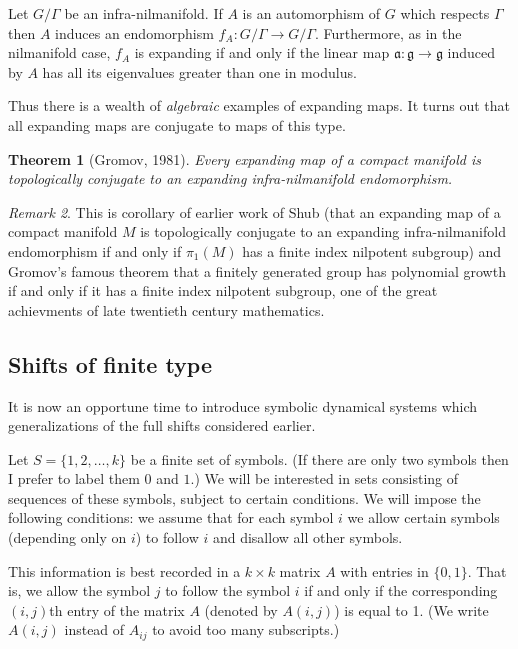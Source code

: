 \documentclass[12pt]{article}
\newtheorem{theorem}{Theorem}[section]
\theoremstyle{definition}
\theoremstyle{remark}
\newtheorem{remark}[theorem]{Remark}
\begin{document}
Let $G/\Gamma$ be an infra-nilmanifold. If $A$ is an automorphism of $G$ which respects $\Gamma$
then $A$ induces an endomorphism $f_A : G/\Gamma \to G/\Gamma$. Furthermore, as in the nilmanifold case, $f_A$ is expanding 
if and only if the linear map $\mathfrak a : \mathfrak g \to \mathfrak g$ induced by $A$ has all its eigenvalues 
greater than one in modulus. 

Thus there is a wealth of {\it algebraic} examples of expanding maps.
It turns out that all expanding maps are conjugate to maps of this type.



\begin{theorem}[Gromov, 1981] 
Every expanding map of a compact manifold is topologically conjugate to an expanding infra-nilmanifold endomorphism.
\end{theorem}

\begin{remark}
This is corollary of earlier work of Shub (that an expanding map of a compact manifold $M$ is topologically conjugate to an expanding infra-nilmanifold endomorphism if and only if $\pi_1(M)$ has a finite index nilpotent subgroup)
and Gromov's famous theorem that a finitely generated group has polynomial growth if and only
if it has a finite index nilpotent subgroup, one of the great achievments of late twentieth 
century mathematics.
\end{remark}

\subsection{Shifts of finite type}

It is now an opportune time to introduce symbolic dynamical systems which generalizations of the full shifts considered earlier.

Let $S = \{1,2,\ldots, k\}$ be a finite set of symbols.  (If there are only two symbols then I prefer to label them $0$ and $1$.)
We will be
interested in sets consisting of sequences of these symbols, subject
to certain conditions.  We will impose the following conditions: we
assume that for each symbol $i$ we allow certain symbols (depending
only on $i$) to follow $i$ and disallow all other symbols.

This information is best recorded in a $k \times k$ matrix $A$ with
entries in $\{0,1\}$.  That is, we allow the symbol $j$ to follow the
symbol $i$ if and only if the corresponding $(i,j)$th entry of the
matrix $A$ (denoted by $A(i,j)$) is equal to 1. (We write $A(i,j)$ instead of $A_{ij}$ to avoid too many subscripts.)
\end{document}
